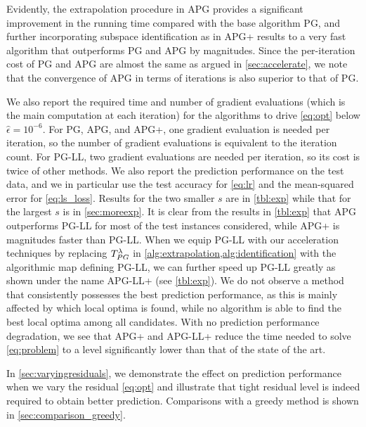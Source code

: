 \documentclass{article}
\newcommand{\Alert}[1]{{ #1}}
\newcommand{\Alertt}[1]{{#1}}
\theoremstyle{plain}
\theoremstyle{definition}
\theoremstyle{remark}
\newcommand{\Tpg}{T_{\rm PG}^{\lambda}}
\begin{document}
Evidently, the extrapolation procedure in APG provides a 
significant improvement in the running time compared with the base algorithm 
PG, and further
incorporating subspace identification as in APG+ results to a very fast algorithm 
that outperforms PG and APG by magnitudes.
Since the per-iteration cost of PG and APG are almost the same as
argued in \cref{sec:accelerate}, we note that the convergence of APG in terms
of iterations is also superior to that of PG.

We also report the required time and number of gradient evaluations (which
is the main computation at each iteration) for the algorithms
to drive \cref{eq:opt} below $\hat \epsilon = 10^{-6}$.
For PG, APG, and APG+, one gradient evaluation is needed per
iteration, so the number of gradient evaluations is equivalent to the
iteration count.
For PG-LL, two gradient evaluations are needed per iteration, so its
cost is twice of other methods.
We also report the prediction performance on the test data,
and we in particular use the test
accuracy for \cref{eq:lr} and the mean-squared error for
\cref{eq:ls_loss}.
Results for the two smaller $s$ are in \cref{tbl:exp} while 
that for
the largest $s$ is in \cref{sec:moreexp}.
It is clear from the results in
\cref{tbl:exp} that APG 
outperforms PG-LL for most of the test instances considered, while
APG+ is magnitudes faster than PG-LL.
When we equip PG-LL with our acceleration techniques
by replacing $\Tpg$ in \cref{alg:extrapolation,alg:identification}
with the algorithmic map defining PG-LL, we can further speed 
up PG-LL greatly as shown under the name APG-LL+ (see \cref{tbl:exp}).
We do not observe a method that consistently possesses the best
prediction performance, as this is mainly affected by which local
optima is found, while no algorithm is able to find the best local
optima among all candidates.
With no prediction performance degradation, we see that APG+ and
APG-LL+ reduce the time needed to solve \cref{eq:problem} to a level
significantly lower than that of the state of the art.

\Alert{In \cref{sec:varyingresiduals}, we demonstrate the effect on 
prediction performance when we vary the residual \cref{eq:opt} and illustrate 
that tight residual level is \Alertt{indeed} required to obtain better prediction. Comparisons 
with a greedy method is shown in \cref{sec:comparison_greedy}.}
\end{document}
